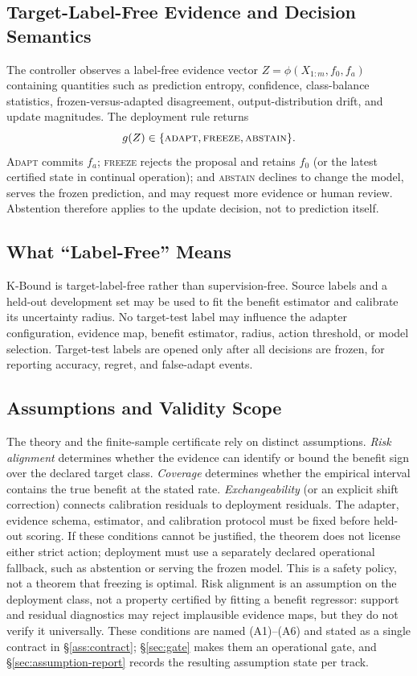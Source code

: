 \subsection{Target-Label-Free Evidence and Decision Semantics}
The controller observes a label-free evidence vector $Z=\phi(X_{1:m},f_0,f_a)$ containing quantities such as prediction entropy, confidence, class-balance statistics, frozen-versus-adapted disagreement, output-distribution drift, and update magnitudes. The deployment rule returns
\[
g(Z)\in\{\textsc{adapt},\textsc{freeze},\textsc{abstain}\}.
\]
\textsc{Adapt} commits $f_a$; \textsc{freeze} rejects the proposal and retains $f_0$ (or the latest certified state in continual operation); and \textsc{abstain} declines to change the model, serves the frozen prediction, and may request more evidence or human review. Abstention therefore applies to the update decision, not to prediction itself.

\subsection{What ``Label-Free'' Means}
K-Bound is target-label-free rather than supervision-free. Source labels and a held-out development set may be used to fit the benefit estimator and calibrate its uncertainty radius. No target-test label may influence the adapter configuration, evidence map, benefit estimator, radius, action threshold, or model selection. Target-test labels are opened only after all decisions are frozen, for reporting accuracy, regret, and false-adapt events.

\subsection{Assumptions and Validity Scope}
The theory and the finite-sample certificate rely on distinct assumptions. \emph{Risk alignment} determines whether the evidence can identify or bound the benefit sign over the declared target class. \emph{Coverage} determines whether the empirical interval contains the true benefit at the stated rate. \emph{Exchangeability} (or an explicit shift correction) connects calibration residuals to deployment residuals. The adapter, evidence schema, estimator, and calibration protocol must be fixed before held-out scoring. If these conditions cannot be justified, the theorem does not license either strict action; deployment must use a separately declared operational fallback, such as abstention or serving the frozen model. This is a safety policy, not a theorem that freezing is optimal. Risk alignment is an assumption on the deployment class, not a property certified by fitting a benefit regressor: support and residual diagnostics may reject implausible evidence maps, but they do not verify it universally. These conditions are named (A1)--(A6) and stated as a single contract in \S\ref{ass:contract}; \S\ref{sec:gate} makes them an operational gate, and \S\ref{sec:assumption-report} records the resulting assumption state per track.

